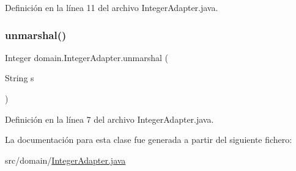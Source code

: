 Definición en la línea 11 del archivo Integer\+Adapter.\+java.


\begin{DoxyCode}{0}

\end{DoxyCode}
\mbox{\label{classdomain_1_1_integer_adapter_ad2bfc5af140573682dd03906b9264b51}} 
\subsubsection{\texorpdfstring{unmarshal()}{unmarshal()}}
{\footnotesize\ttfamily Integer domain.\+Integer\+Adapter.\+unmarshal (\begin{DoxyParamCaption}\item[{String}]{s }\end{DoxyParamCaption})}



Definición en la línea 7 del archivo Integer\+Adapter.\+java.


\begin{DoxyCode}{0}

\end{DoxyCode}


La documentación para esta clase fue generada a partir del siguiente fichero\+:\begin{DoxyCompactItemize}
\item 
src/domain/\mbox{\hyperlink{_integer_adapter_8java}{Integer\+Adapter.\+java}}\end{DoxyCompactItemize}
